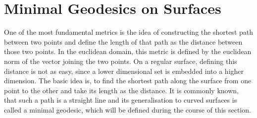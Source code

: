 \section{Minimal Geodesics on Surfaces}
One of the most fundamental metrics is the idea of constructing the shortest path between two points and define the length of that path as the distance between those two points.
In the euclidean domain, this metric is defined by the euclidean norm of the vector joining the two points.
On a regular surface, defining this distance is not as easy, since a lower dimensional set is embedded into a higher dimension.
The basic idea is, to find the shortest path along the surface from one point to the other and take its length as the distance.
It is commonly known, that such a path is a straight line and its generalisation to curved surfaces is called a minimal geodesic, which will be defined during the course of this section.

